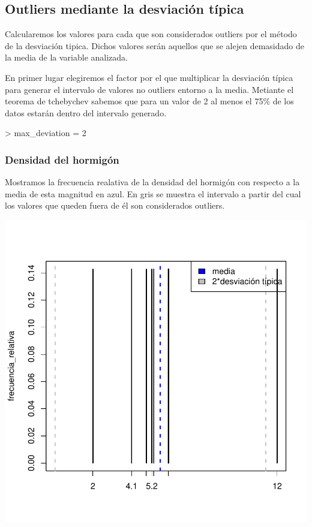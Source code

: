 \documentclass [a4paper] {article}
\begin{document}
\newpage
\subsection{Outliers mediante la desviación típica}
Calcularemos los valores para cada que son considerados outliers por el método de la desviación tipica.
Dichos valores serán aquellos que se alejen demasidado de la media de la variable analizada.

En primer lugar elegiremos el factor por el que multiplicar la desviación típica para generar el intervalo de valores no outliers entorno a la media.
Metiante el teorema de tchebychev sabemos que para un valor de 2 al menos el 75\% de los datos estarán dentro del intervalo generado.
\begin{Schunk}
\begin{Sinput}
> max_deviation = 2
\end{Sinput}
\end{Schunk}

\subsubsection{Densidad del hormigón}
Mostramos la frecuencia realativa de la densidad del hormigón con respecto a la media de esta magnitud en azul.
En gris se muestra el intervalo a partir del cual los valores que queden fuera de él son considerados outliers.
\begin{center}
\begin{Schunk}
\end{Schunk}
\includegraphics{entrega-desviacion_tipica_densidad_plot}
\end{center}
\end{document}
